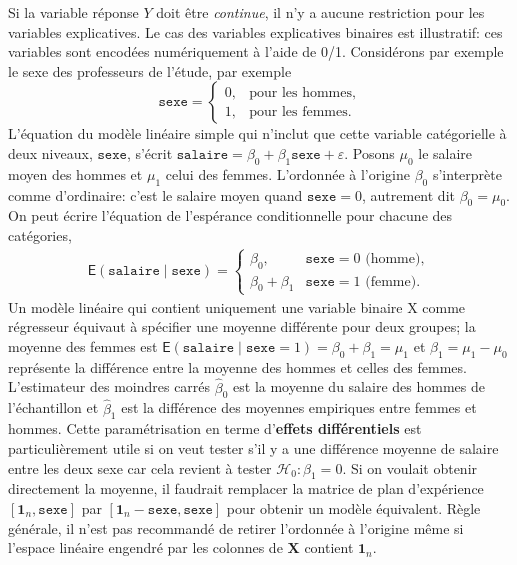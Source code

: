 \documentclass[
  11pt,
  letterpaper,
]{article}
\theoremstyle{definition}
\theoremstyle{definition}
\theoremstyle{definition}
\theoremstyle{remark}
\begin{document}
Si la variable réponse \(Y\) doit être \emph{continue}, il n'y a aucune restriction pour les variables explicatives. Le cas des variables explicatives binaires est illustratif: ces variables sont encodées numériquement à l'aide de 0/1. Considérons par exemple le sexe des professeurs de l'étude, par exemple
\[\texttt{sexe} = \begin{cases} 0 , & \text{pour les hommes},\\
1, & \text{pour les femmes.}
\end{cases}
\]
L'équation du modèle linéaire simple qui n'inclut que cette variable catégorielle à deux niveaux, \(\texttt{sexe}\), s'écrit \(\texttt{salaire} = \beta_0 + \beta_1 \texttt{sexe} + \varepsilon\). Posons \(\mu_0\) le salaire moyen des hommes et \(\mu_1\) celui des femmes. L'ordonnée à l'origine \(\beta_0\) s'interprète comme d'ordinaire: c'est le salaire moyen quand \(\texttt{sexe}=0\), autrement dit \(\beta_0=\mu_0\). On peut écrire l'équation de l'espérance conditionnelle pour chacune des catégories,
\begin{align*}
\mathsf{E}(\texttt{salaire} \mid \texttt{sexe})= \begin{cases}
\beta_0, & \texttt{sexe}=0 \text{ (homme)}, \\
\beta_0 + \beta_1 & \texttt{sexe}=1 \text{ (femme)}.
\end{cases}
\end{align*}
Un modèle linéaire qui contient uniquement une variable binaire \(\mathrm{X}\) comme régresseur équivaut à spécifier une moyenne différente pour deux groupes; la moyenne des femmes est \(\mathsf{E}(\texttt{salaire} \mid \texttt{sexe}=1) = \beta_0 + \beta_1 = \mu_1\) et \(\beta_1=\mu_1-\mu_0\) représente la différence entre la moyenne des hommes et celles des femmes. L'estimateur des moindres carrés \(\widehat{\beta}_0\) est la moyenne du salaire des hommes de l'échantillon et \(\widehat{\beta}_1\) est la différence des moyennes empiriques entre femmes et hommes. Cette paramétrisation en terme d'\textbf{effets différentiels} est particulièrement utile si on veut tester s'il y a une différence moyenne de salaire entre les deux sexe car cela revient à tester \(\mathscr{H}_0: \beta_1=0\). Si on voulait obtenir directement la moyenne, il faudrait remplacer la matrice de plan d'expérience \([\mathbf{1}_n, \texttt{sexe}]\) par \([\mathbf{1}_n- \texttt{sexe}, \texttt{sexe}]\) pour obtenir un modèle équivalent. Règle générale, il n'est pas recommandé de retirer l'ordonnée à l'origine même si l'espace linéaire engendré par les colonnes de \(\mathbf{X}\) contient \(\mathbf{1}_n\).
\end{document}
